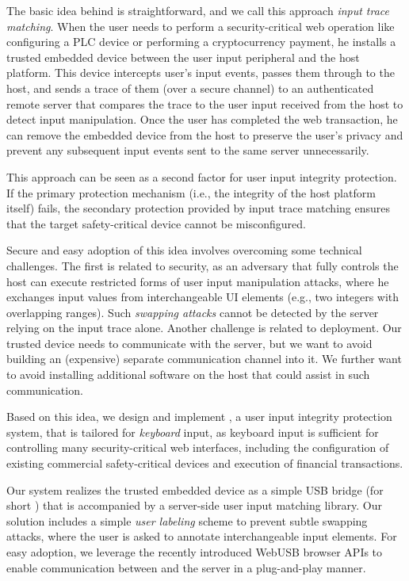 The basic idea behind \name is straightforward, and we call this approach \emph{input trace matching}.  When the user needs to perform a security-critical web operation like configuring a PLC device or performing a cryptocurrency payment, he installs a trusted embedded device between the user input peripheral and the host platform. This device intercepts user's input events, passes them through to the host, and sends a trace of them (over a secure channel) to an authenticated remote server that compares the trace to the user input received from the host to detect input manipulation. Once the user has completed the web transaction, he can remove the embedded device from the host to preserve the user's privacy and prevent any subsequent input events sent to the same server unnecessarily.

This approach can be seen as a second factor for user input integrity protection. If the primary protection mechanism (i.e., the integrity of the host platform itself) fails, the secondary protection provided by input trace matching ensures that the target safety-critical device cannot be misconfigured.

Secure and easy adoption of this idea involves overcoming some technical challenges. The first is related to security, as an adversary that fully controls the host can execute restricted forms of user input manipulation attacks, where he exchanges input values from interchangeable UI elements (e.g., two integers with overlapping ranges). Such \emph{swapping attacks} cannot be detected by the server relying on the input trace alone. Another challenge is related to deployment. Our trusted device needs to communicate with the server, but we want to avoid building an (expensive) separate communication channel into it. We further want to avoid installing additional software on the host that could assist in such communication. 


 Based on this idea, we design and implement \name, a user input integrity protection system, that is tailored for \emph{keyboard} input, as keyboard input is sufficient for controlling many security-critical web interfaces, including the configuration of existing commercial safety-critical devices and execution of financial transactions.

Our system realizes the trusted embedded device as a simple USB bridge (for short \device) that is accompanied by a server-side user input matching library. Our solution includes a simple \emph{user labeling} scheme to prevent subtle swapping attacks, where the user is asked to annotate interchangeable input elements. For easy adoption, we leverage the recently introduced WebUSB browser APIs to enable communication between \device and the server in a plug-and-play manner. 


